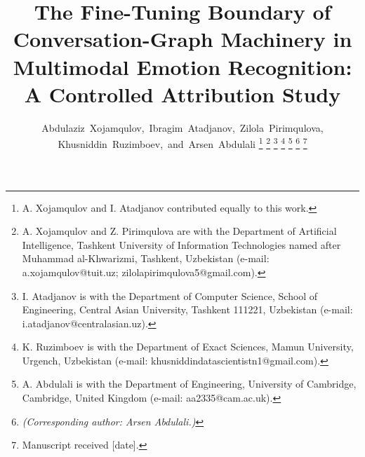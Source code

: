 \documentclass[journal]{IEEEtran}
\begin{document}
\title{The Fine-Tuning Boundary of Conversation-Graph Machinery in Multimodal Emotion Recognition: A Controlled Attribution Study}

\author{Abdulaziz~Xojamqulov,~Ibragim~Atadjanov,~Zilola~Pirimqulova,
        Khusniddin~Ruzimboev,~and~Arsen~Abdulali%
\thanks{A. Xojamqulov and I. Atadjanov contributed equally to this work.}%
\thanks{A. Xojamqulov and Z. Pirimqulova are with the Department of Artificial Intelligence, Tashkent University of Information Technologies named after Muhammad al-Khwarizmi, Tashkent, Uzbekistan (e-mail: a.xojamqulov@tuit.uz; zilolapirimqulova5@gmail.com).}%
\thanks{I. Atadjanov is with the Department of Computer Science, School of Engineering, Central Asian University, Tashkent 111221, Uzbekistan (e-mail: i.atadjanov@centralasian.uz).}%
\thanks{K. Ruzimboev is with the Department of Exact Sciences, Mamun University, Urgench, Uzbekistan (e-mail: khusniddindatascientistn1@gmail.com).}%
\thanks{A. Abdulali is with the Department of Engineering, University of Cambridge, Cambridge, United Kingdom (e-mail: aa2335@cam.ac.uk).}%
\thanks{\textit{(Corresponding author: Arsen Abdulali.)}}%
\thanks{Manuscript received [date].}}


\maketitle
\end{document}
